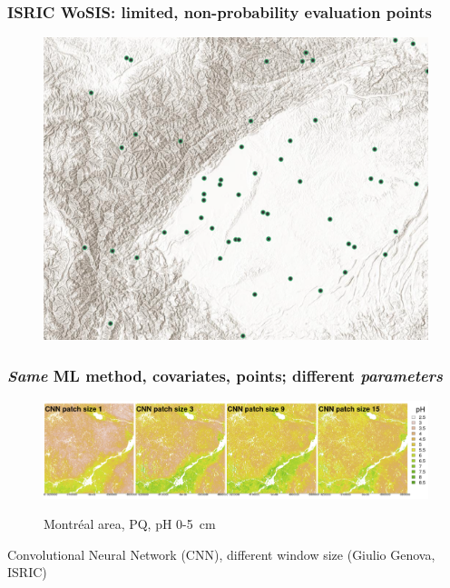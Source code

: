 \documentclass[aspectratio=169, 10pt]{beamer}
\begin{document}
\begin{frame}
  \frametitle{ISRIC WoSIS: limited, non-probability evaluation points}
\begin{figure}
    \centering
\includegraphics[height=0.65\textheight]{./graphics_david/SoilGridsProfiles_Chengdu.png}
\end{figure}
\end{frame}


\begin{frame}
  \frametitle{\emph{Same} ML method, covariates, points; different
    \emph{parameters}}
    \begin{figure}
        \centering
        \includegraphics[width=\textwidth]{./graphics_david/GenovaPosterFig1a.png}
        \par Montr\'{e}al area, PQ, pH 0-5~cm
    \end{figure}
{Convolutional Neural Network (CNN), different window size (Giulio Genova, ISRIC)}
\end{frame}
\end{document}
